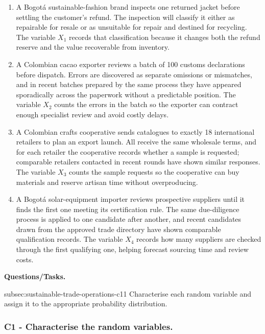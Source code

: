 	\begin{enumerate}
		\item A Bogotá sustainable-fashion brand inspects one returned jacket before settling the customer's refund. The inspection will classify it either as repairable for resale or as unsuitable for repair and destined for recycling. The variable \(X_1\) records that classification because it changes both the refund reserve and the value recoverable from inventory.
		\item A Colombian cacao exporter reviews a batch of 100 customs declarations before dispatch. Errors are discovered as separate omissions or mismatches, and in recent batches prepared by the same process they have appeared sporadically across the paperwork without a predictable position. The variable \(X_2\) counts the errors in the batch so the exporter can contract enough specialist review and avoid costly delays.
		\item A Colombian crafts cooperative sends catalogues to exactly 18 international retailers to plan an export launch. All receive the same wholesale terms, and for each retailer the cooperative records whether a sample is requested; comparable retailers contacted in recent rounds have shown similar responses. The variable \(X_3\) counts the sample requests so the cooperative can buy materials and reserve artisan time without overproducing.
		\item A Bogotá solar-equipment importer reviews prospective suppliers until it finds the first one meeting its certification rule. The same due-diligence process is applied to one candidate after another, and recent candidates drawn from the approved trade directory have shown comparable qualification records. The variable \(X_4\) records how many suppliers are checked through the first qualifying one, helping forecast sourcing time and review costs.
	\end{enumerate}

	\textbf{Questions/Tasks.}
	\begin{enumerate}
		\CriterionTask
		{subsec:sustainable-trade-operations-c1}{1}
		{Characterise each random variable and assign it to the appropriate probability distribution.}
	\end{enumerate}

	\subsubsection*{C1 - Characterise the random variables.}
	\label{subsec:sustainable-trade-operations-c1}

